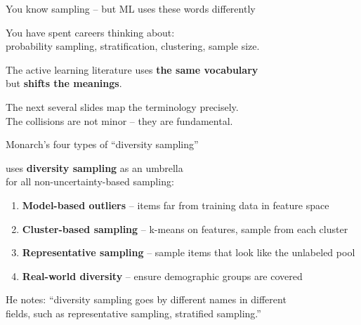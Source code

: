 \documentclass[aspectratio=169,11pt]{beamer}
\begin{document}
\begin{frame}{You know sampling -- but ML uses these words differently}

You have spent careers thinking about:\\
probability sampling, stratification, clustering, sample size.

\vspace{1em}

The active learning literature uses \textbf{the same vocabulary}\\
but \textbf{shifts the meanings}.

\vspace{1em}

The next several slides map the terminology precisely.\\
The collisions are not minor -- they are fundamental.
\end{frame}

\begin{frame}{Monarch's four types of ``diversity sampling''}

\citet{monarch2021human} uses \textbf{diversity sampling} as an umbrella\\
for all non-uncertainty-based sampling:

\vspace{1em}

\begin{enumerate}
  \item \textbf{Model-based outliers} -- items far from training data in feature space
  \item \textbf{Cluster-based sampling} -- k-means on features, sample from each cluster
  \item \textbf{Representative sampling} -- sample items that look like the unlabeled pool
  \item \textbf{Real-world diversity} -- ensure demographic groups are covered
\end{enumerate}

\vspace{1em}

He notes: ``diversity sampling goes by different names in different\\
fields, such as representative sampling, stratified sampling.''
\end{frame}
\end{document}
